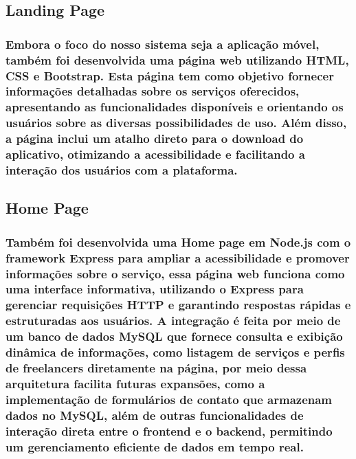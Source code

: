 \subsection{Landing Page}
\subsubsection{Embora o foco do nosso sistema seja a aplicação móvel, também foi desenvolvida uma página web utilizando HTML, CSS e Bootstrap. Esta página tem como objetivo fornecer informações detalhadas sobre os serviços oferecidos, apresentando as funcionalidades disponíveis e orientando os usuários sobre as diversas possibilidades de uso. Além disso, a página inclui um atalho direto para o download do aplicativo, otimizando a acessibilidade e facilitando a interação dos usuários com a plataforma.}

\subsection{Home Page }
\subsubsection{Também foi desenvolvida uma Home page em Node.js com o framework Express para ampliar a acessibilidade e promover informações sobre o serviço, essa página web funciona como uma interface informativa, utilizando o Express para gerenciar requisições HTTP e garantindo respostas rápidas e estruturadas aos usuários. A integração é feita por meio de um banco de dados MySQL que fornece consulta e exibição dinâmica de informações, como listagem de serviços e perfis de freelancers diretamente na página, por meio dessa arquitetura facilita futuras expansões, como a implementação de formulários de contato que armazenam dados no MySQL, além de outras funcionalidades de interação direta entre o frontend e o backend, permitindo um gerenciamento eficiente de dados em tempo real.} 

